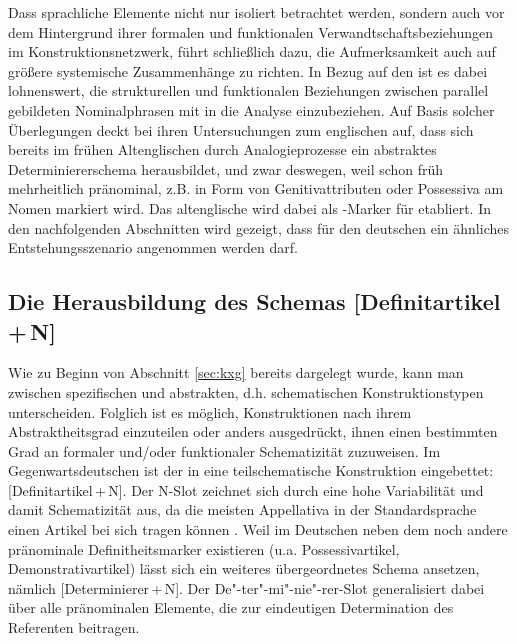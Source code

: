 Dass sprachliche Elemente nicht nur isoliert betrachtet werden, sondern auch vor dem Hintergrund ihrer formalen und funktionalen Verwandtschaftsbeziehungen im Konstruktionsnetzwerk, führt schließlich dazu, die Aufmerksamkeit auch auf größere systemische Zusammenhänge zu richten. In Bezug auf den  ist es dabei lohnenswert, die strukturellen und funktionalen Beziehungen zwischen parallel gebildeten Nominalphrasen mit in die Analyse einzubeziehen. Auf Basis solcher Überlegungen deckt \textcite{Sommerer2011,Sommerer2012,Sommerer2015} bei ihren Untersuchungen zum englischen  auf, dass sich bereits im frühen Altenglischen durch Analogieprozesse  ein abstraktes Determiniererschema herausbildet, und zwar deswegen, weil  schon früh mehrheitlich pränominal, z.B. in Form von Genitivattributen oder Possessiva  am Nomen markiert wird. Das altenglische   wird dabei als -Marker für  etabliert. In den nachfolgenden Abschnitten wird gezeigt, dass für den deutschen  ein ähnliches Entstehungsszenario angenommen werden darf. 

\subsection{Die Herausbildung des Schemas [Definitartikel\,+\,N]}\label{sec:schema}

Wie zu Beginn von Abschnitt \ref{sec:kxg} bereits dargelegt wurde, kann man zwischen spezifischen  und abstrakten, d.h. schematischen Konstruktionstypen unterscheiden.
Folglich ist es möglich, Konstruktionen nach ihrem Abstraktheitsgrad einzuteilen oder anders ausgedrückt, ihnen einen bestimmten Grad an formaler und/\-oder funktionaler Schematizität zuzuweisen. Im Gegenwartsdeutschen ist der  in eine teilschematische Konstruktion   eingebettet: [Definitartikel\,+\,N]. Der N-Slot zeichnet sich durch eine hohe Variabilität und damit Schematizität aus, da die meisten Appellativa in der Standardsprache einen Artikel bei sich tragen können \parencite[zu den Ausnahmen s.][]{DAvis2013}.
Weil im Deutschen neben dem  noch andere pränominale Definitheitsmarker  existieren (u.a. Possessivartikel, Demonstrativartikel)   lässt sich ein weiteres übergeordnetes Schema ansetzen, nämlich [Determinierer\,+\,N]. Der De"-ter"-mi"-nie"-rer-Slot generalisiert dabei über alle pränominalen Elemente, die zur eindeutigen Determination des Referenten beitragen. 

